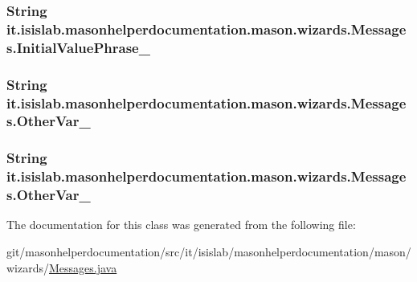 \hypertarget{classit_1_1isislab_1_1masonhelperdocumentation_1_1mason_1_1wizards_1_1_messages_a7a1318f8e98dac2c10e61a75eb494f27}{
\subsubsection[{Initial\-Value\-Phrase\-\_\-1}]{\setlength{\rightskip}{0pt plus 5cm}String it.\-isislab.\-masonhelperdocumentation.\-mason.\-wizards.\-Messages.\-Initial\-Value\-Phrase\-\_\hspace{0.3cm}{\ttfamily [static]}}}\label{classit_1_1isislab_1_1masonhelperdocumentation_1_1mason_1_1wizards_1_1_messages_a7a1318f8e98dac2c10e61a75eb494f27}
\hypertarget{classit_1_1isislab_1_1masonhelperdocumentation_1_1mason_1_1wizards_1_1_messages_a74705c5328fba20699a38bc26bad085b}{
\subsubsection[{Other\-Var\-\_\-1}]{\setlength{\rightskip}{0pt plus 5cm}String it.\-isislab.\-masonhelperdocumentation.\-mason.\-wizards.\-Messages.\-Other\-Var\-\_\hspace{0.3cm}{\ttfamily [static]}}}\label{classit_1_1isislab_1_1masonhelperdocumentation_1_1mason_1_1wizards_1_1_messages_a74705c5328fba20699a38bc26bad085b}
\hypertarget{classit_1_1isislab_1_1masonhelperdocumentation_1_1mason_1_1wizards_1_1_messages_acb3db6a7e2ad9401ad4b036a383507b1}{
\subsubsection[{Other\-Var\-\_\-2}]{\setlength{\rightskip}{0pt plus 5cm}String it.\-isislab.\-masonhelperdocumentation.\-mason.\-wizards.\-Messages.\-Other\-Var\-\_\hspace{0.3cm}{\ttfamily [static]}}}\label{classit_1_1isislab_1_1masonhelperdocumentation_1_1mason_1_1wizards_1_1_messages_acb3db6a7e2ad9401ad4b036a383507b1}


The documentation for this class was generated from the following file\-:\begin{DoxyCompactItemize}
\item 
git/masonhelperdocumentation/src/it/isislab/masonhelperdocumentation/mason/wizards/\hyperlink{mason_2wizards_2_messages_8java}{Messages.\-java}\end{DoxyCompactItemize}
